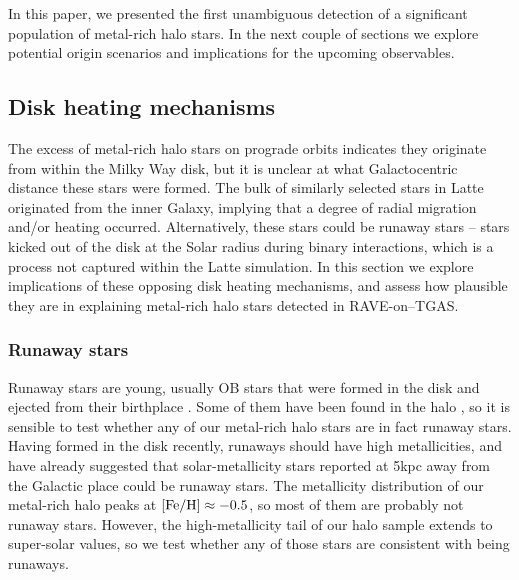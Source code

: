 \documentclass[apj, twocolappendix, numberedappendix, appendixfloats]{emulateapj}
\begin{document}
In this paper, we presented the first unambiguous detection of a significant population of metal-rich halo stars.
In the next couple of sections we explore potential origin scenarios and implications for the upcoming observables.


\subsection{Disk heating mechanisms}
\label{sec:diskheating}
The excess of metal-rich halo stars on prograde orbits indicates they originate from within the Milky Way disk, but it is unclear at what Galactocentric distance these stars were formed.
The bulk of similarly selected stars in Latte originated from the inner Galaxy, implying that a degree of radial migration and/or heating occurred.
Alternatively, these stars could be runaway stars -- stars kicked out of the disk at the Solar radius during binary interactions, which is a process not captured within the Latte simulation.
In this section we explore implications of these opposing disk heating mechanisms, and assess how plausible they are in explaining metal-rich halo stars detected in RAVE-on--TGAS.

\subsubsection{Runaway stars}
\label{sec:runaway}
Runaway stars are young, usually OB stars that were formed in the disk and ejected from their birthplace \citep{blaauw1961}.
Some of them have been found in the halo \citep[e.g.,][]{conlon1990}, so it is sensible to test whether any of our metal-rich halo stars are in fact runaway stars.
Having formed in the disk recently, runaways should have high metallicities, and \citet{bromley2009} have already suggested that solar-metallicity stars reported at 5\;kpc away from the Galactic place \citep{ivezic2008} could be runaway stars.
The metallicity distribution of our metal-rich halo peaks at $\rm[Fe/H]\approx-0.5$, so most of them are probably not runaway stars.
However, the high-metallicity tail of our halo sample extends to super-solar values, so we test whether any of those stars are consistent with being runaways.
\end{document}
